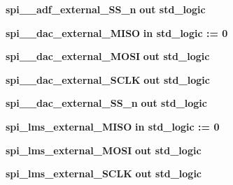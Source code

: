 \begin{DoxyCompactItemize}
\item 
{\bf spi\+\_\+\_\+adf\+\_\+external\+\_\+\+S\+S\+\_\+n}  {\bfseries {\bfseries \textcolor{keywordflow}{out}\textcolor{vhdlchar}{ }}} {\bfseries \textcolor{comment}{std\+\_\+logic}\textcolor{vhdlchar}{ }} 
\item 
{\bf spi\+\_\+\_\+dac\+\_\+external\+\_\+\+M\+I\+SO}  {\bfseries {\bfseries \textcolor{keywordflow}{in}\textcolor{vhdlchar}{ }}} {\bfseries \textcolor{comment}{std\+\_\+logic}\textcolor{vhdlchar}{ }\textcolor{vhdlchar}{ }\textcolor{vhdlchar}{\+:}\textcolor{vhdlchar}{=}\textcolor{vhdlchar}{ }\textcolor{vhdlchar}{ }\textcolor{vhdlchar}{\textquotesingle{}}\textcolor{vhdlchar}{ } \textcolor{vhdldigit}{0} \textcolor{vhdlchar}{ }\textcolor{vhdlchar}{\textquotesingle{}}\textcolor{vhdlchar}{ }} 
\item 
{\bf spi\+\_\+\_\+dac\+\_\+external\+\_\+\+M\+O\+SI}  {\bfseries {\bfseries \textcolor{keywordflow}{out}\textcolor{vhdlchar}{ }}} {\bfseries \textcolor{comment}{std\+\_\+logic}\textcolor{vhdlchar}{ }} 
\item 
{\bf spi\+\_\+\_\+dac\+\_\+external\+\_\+\+S\+C\+LK}  {\bfseries {\bfseries \textcolor{keywordflow}{out}\textcolor{vhdlchar}{ }}} {\bfseries \textcolor{comment}{std\+\_\+logic}\textcolor{vhdlchar}{ }} 
\item 
{\bf spi\+\_\+\_\+dac\+\_\+external\+\_\+\+S\+S\+\_\+n}  {\bfseries {\bfseries \textcolor{keywordflow}{out}\textcolor{vhdlchar}{ }}} {\bfseries \textcolor{comment}{std\+\_\+logic}\textcolor{vhdlchar}{ }} 
\item 
{\bf spi\+\_\+lms\+\_\+external\+\_\+\+M\+I\+SO}  {\bfseries {\bfseries \textcolor{keywordflow}{in}\textcolor{vhdlchar}{ }}} {\bfseries \textcolor{comment}{std\+\_\+logic}\textcolor{vhdlchar}{ }\textcolor{vhdlchar}{ }\textcolor{vhdlchar}{\+:}\textcolor{vhdlchar}{=}\textcolor{vhdlchar}{ }\textcolor{vhdlchar}{ }\textcolor{vhdlchar}{\textquotesingle{}}\textcolor{vhdlchar}{ } \textcolor{vhdldigit}{0} \textcolor{vhdlchar}{ }\textcolor{vhdlchar}{\textquotesingle{}}\textcolor{vhdlchar}{ }} 
\item 
{\bf spi\+\_\+lms\+\_\+external\+\_\+\+M\+O\+SI}  {\bfseries {\bfseries \textcolor{keywordflow}{out}\textcolor{vhdlchar}{ }}} {\bfseries \textcolor{comment}{std\+\_\+logic}\textcolor{vhdlchar}{ }} 
\item 
{\bf spi\+\_\+lms\+\_\+external\+\_\+\+S\+C\+LK}  {\bfseries {\bfseries \textcolor{keywordflow}{out}\textcolor{vhdlchar}{ }}} {\bfseries \textcolor{comment}{std\+\_\+logic}\textcolor{vhdlchar}{ }} 
\item 

\end{DoxyCompactItemize}
